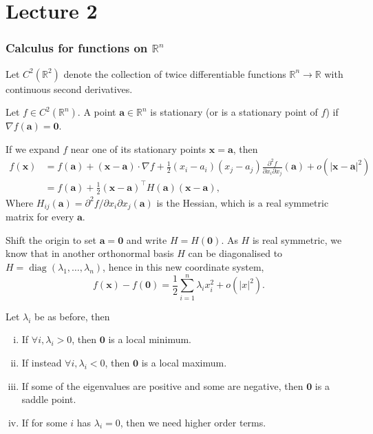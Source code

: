 \documentclass[a4paper]{article}
\begin{document}
\part*{Lecture 2}
\section{Calculus for functions on $ \mathbb{R} ^n $}
Let $C^2(\mathbb R^2)$ denote the collection of twice differentiable functions $\mathbb R^n\to\mathbb R$ with continuous second derivatives.
\begin{definition}
    Let $f\in C^2(\mathbb R^n)$.
    A point $\mathbf{a}\in\mathbb R^n$ is stationary (or is a stationary point of $f$) if $\nabla f(\mathbf{a})=\mathbf{0}$.
\end{definition}
If we expand $f$ near one of its stationary points $\mathbf{x}=\mathbf{a}$, then
\begin{align*}
    f(\mathbf{x})&=f(\mathbf{a})+(\mathbf{x}-\mathbf{a})\cdot\nabla f+\frac{1}{2}(x_i-a_i)(x_j-a_j)\frac{\partial^2f}{\partial x_i\partial x_j}(\mathbf{a})+o(|\mathbf{x}-\mathbf{a}|^2)\\
    &=f(\mathbf{a})+\frac{1}{2}(\mathbf{x}-\mathbf{a})^\top H(\mathbf{a})(\mathbf{x}-\mathbf{a}),
\end{align*}
Where $H_{ij}(\mathbf{a})=\partial^2f/\partial x_i\partial x_j(\mathbf{a})$ is the Hessian, which is a real symmetric matrix for every $\mathbf{a}$.

Shift the origin to set $\mathbf{a}=\mathbf{0}$ and write $H=H(\mathbf{0})$.
As $H$ is real symmetric, we know that in another orthonormal basis $H$ can be diagonalised to $H=\operatorname{diag}(\lambda_1,\ldots,\lambda_n)$, hence in this new coordinate system,
$$f(\mathbf{x})-f(\mathbf{0})=\frac{1}{2}\sum_{i=1}^n\lambda_ix_i^2+o(|x|^2).$$

\begin{theorem}
    Let $\lambda_i$ be as before, then 
    \begin{enumerate}[(i)]
        \item If $\forall i,\lambda_i>0$, then $\mathbf{0}$ is a local minimum.
        \item If instead $\forall i,\lambda_i<0$, then $\mathbf{0}$ is a local maximum.
        \item If some of the eigenvalues are positive and some are negative, then $ \mathbf{0} $ is a saddle point.
        \item If for some $i$ has $\lambda_i=0$, then we need higher order terms. 
    \end{enumerate}
\end{theorem}
\end{document}
